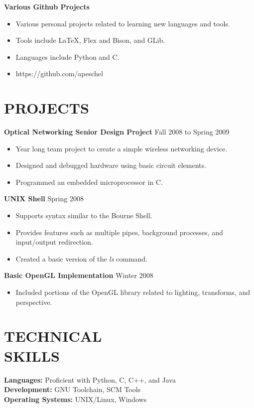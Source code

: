 \documentclass[10pt,line,margin]{res}
\begin{document}
\begin{resume}
    {\bf Various Github Projects}
    \begin{itemize} \itemsep -2pt
    \item Various personal projects related to learning new languages and tools.
    \item Tools include LaTeX, Flex and Bison, and GLib.
    \item Languages include Python and C.
    \item https://github.com/apeschel
    \end{itemize}

\section {PROJECTS}

    {\bf Optical Networking Senior Design Project} \hfill Fall 2008 to Spring 2009
    \begin{itemize} \itemsep -2pt
    \item Year long team project to create a simple wireless networking device.
    \item Designed and debugged hardware using basic circuit elements.
    \item Programmed an embedded microprocessor in C.
    \end{itemize}

    {\bf UNIX Shell} \hfill Spring 2008
    \begin{itemize} \itemsep -2pt
    \item Supports syntax similar to the Bourne Shell.
    \item Provides features such as multiple pipes, background processes,
    and input/output redirection.
    \item Created a basic version of the \textit{ls} command.
    \end{itemize}

    {\bf Basic OpenGL Implementation} \hfill Winter 2008
    \begin{itemize} \itemsep -2pt
    \item Included portions of the OpenGL library
    related to lighting, transforms, and perspective.
    \end{itemize}

\section{TECHNICAL \\ SKILLS}
    {\bf Languages:} Proficient with Python, C, C++, and Java \\
    {\bf Development:} GNU Toolchain, SCM Tools \\
    {\bf Operating Systems:} UNIX/Linux, Windows \\

\end{resume}
\end{document}
